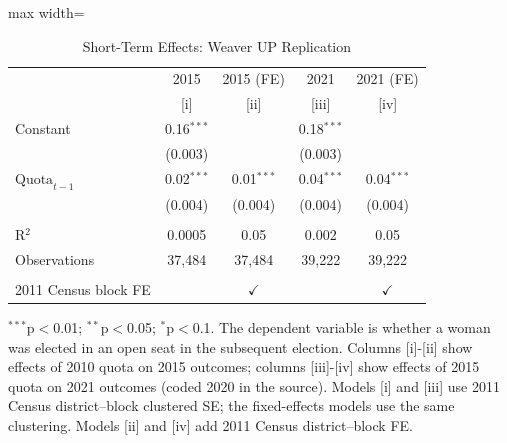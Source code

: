 
\begin{table}[htbp]
   \centering
   \scriptsize
   \begin{adjustbox}{max width=\linewidth}
      \begin{threeparttable}[b]
         \caption{\label{tab:weaver_short} Short-Term Effects: Weaver UP Replication}
         \bigskip
         \begin{tabular}{lcccc}
            \toprule
                                  & 2015         & 2015 (FE)     & 2021         & 2021 (FE) \\   
                                  & [i]          & [ii]          & [iii]        & [iv]\\  
            \midrule 
            Constant              & 0.16$^{***}$ &               & 0.18$^{***}$ &   \\   
                                  & (0.003)      &               & (0.003)      &   \\   
            $\text{Quota}_{t-1}$  & 0.02$^{***}$ & 0.01$^{***}$  & 0.04$^{***}$ & 0.04$^{***}$\\   
                                  & (0.004)      & (0.004)       & (0.004)      & (0.004)\\   
             \\
            R$^2$                 & 0.0005       & 0.05          & 0.002        & 0.05\\  
            Observations          & 37,484       & 37,484        & 39,222       & 39,222\\  
             \\
            2011 Census block FE  &              & $\checkmark$  &              & $\checkmark$\\   
            \bottomrule
         \end{tabular}
         
         \begin{tablenotes}
            \item $^{***}$p$<$0.01; $^{**}$p$<$0.05; $^{*}$p$<$0.1. The dependent variable is whether a woman was elected in an open seat in the subsequent election. Columns [i]-[ii] show effects of 2010 quota on 2015 outcomes; columns [iii]-[iv] show effects of 2015 quota on 2021 outcomes (coded 2020 in the source). Models [i] and [iii] use 2011 Census district--block clustered SE; the fixed-effects models use the same clustering. Models [ii] and [iv] add 2011 Census district--block FE.
         \end{tablenotes}
      \end{threeparttable}
   \end{adjustbox}
\end{table}


